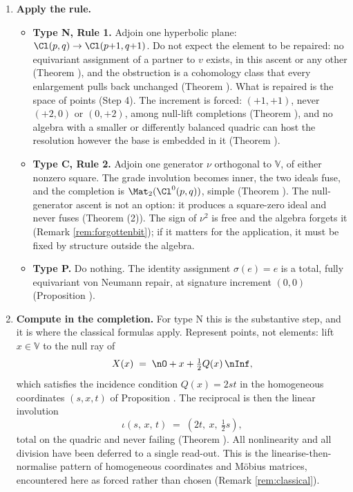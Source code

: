 \begin{enumerate}
\item[\textbf{Step 3.}] \textbf{Apply the rule.}
  \begin{itemize}
  \item \textbf{Type N, Rule 1.} Adjoin one hyperbolic plane: $\Cl(p,q) \to \Cl(p{+}1,q{+}1)$. Do not expect the element to be repaired: no equivariant assignment of a partner to $v$ exists, in this ascent or any other (Theorem ), and the obstruction is a cohomology class that every enlargement pulls back unchanged (Theorem ). What is repaired is the space of points (Step 4). The increment is forced: $(+1,+1)$, never $(+2,0)$ or $(0,+2)$, among null-lift completions (Theorem ), and no algebra with a smaller or differently balanced quadric can host the resolution however the base is embedded in it (Theorem ).
  \item \textbf{Type C, Rule 2.} Adjoin one generator $\nu$ orthogonal to $\mathbb{V}$, of either nonzero square. The grade involution becomes inner, the two ideals fuse, and the completion is $\Mat_2(\Cl^0(p,q))$, simple (Theorem ). The null-generator ascent is not an option: it produces a square-zero ideal and never fuses (Theorem (2)). The sign of $\nu^2$ is free and the algebra forgets it (Remark \ref{rem:forgottenbit}); if it matters for the application, it must be fixed by structure outside the algebra.
  \item \textbf{Type P.} Do nothing. The identity assignment $\sigma(e) = e$ is a total, fully equivariant von Neumann repair, at signature increment $(0,0)$ (Proposition ).
  \end{itemize}

\item[\textbf{Step 4.}] \textbf{Compute in the completion.} For type N this is the substantive step, and it is where the classical formulas apply. Represent points, not elements: lift $x \in \mathbb{V}$ to the null ray of
  \[
  X(x) \;=\; \nO + x + \tfrac12 Q(x)\,\nInf ,
  \]
  which satisfies the incidence condition $Q(x) = 2st$ in the homogeneous coordinates $(s,x,t)$ of Proposition . The reciprocal is then the linear involution
  \[
  \iota(s,\,x,\,t) \;=\; (2t,\ x,\ \tfrac12 s),
  \]
  total on the quadric and never failing (Theorem ). All nonlinearity and all division have been deferred to a single read-out. This is the linearise-then-normalise pattern of homogeneous coordinates and M\"obius matrices, encountered here as forced rather than chosen (Remark \ref{rem:classical}).


\end{enumerate}
